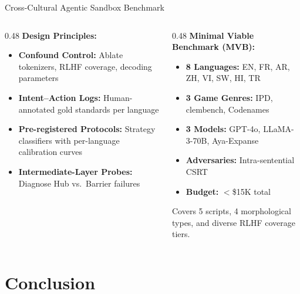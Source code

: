 \documentclass[11pt,aspectratio=169]{beamer}
\begin{document}
\begin{frame}{Cross-Cultural Agentic Sandbox Benchmark}
    \begin{columns}[T]
        \begin{column}{0.48\textwidth}
            \textbf{Design Principles:}
            \begin{itemize}
                \item \textbf{Confound Control:} Ablate tokenizers, RLHF coverage, decoding parameters
                \item \textbf{Intent--Action Logs:} Human-annotated gold standards per language
                \item \textbf{Pre-registered Protocols:} Strategy classifiers with per-language calibration curves
                \item \textbf{Intermediate-Layer Probes:} Diagnose Hub vs.\ Barrier failures
            \end{itemize}
        \end{column}
        \begin{column}{0.48\textwidth}
            \textbf{Minimal Viable Benchmark (MVB):}
            \begin{itemize}
                \item \textbf{8 Languages:} EN, FR, AR, ZH, VI, SW, HI, TR
                \item \textbf{3 Game Genres:} IPD, clembench, Codenames
                \item \textbf{3 Models:} GPT-4o, LLaMA-3-70B, Aya-Expanse
                \item \textbf{Adversaries:} Intra-sentential CSRT
                \item \textbf{Budget:} $<$\$15K total
            \end{itemize}
            \vspace{0.2cm}
            {\small Covers 5 scripts, 4 morphological types, and diverse RLHF coverage tiers.}
        \end{column}
    \end{columns}
\end{frame}

\section{Conclusion}
\end{document}
